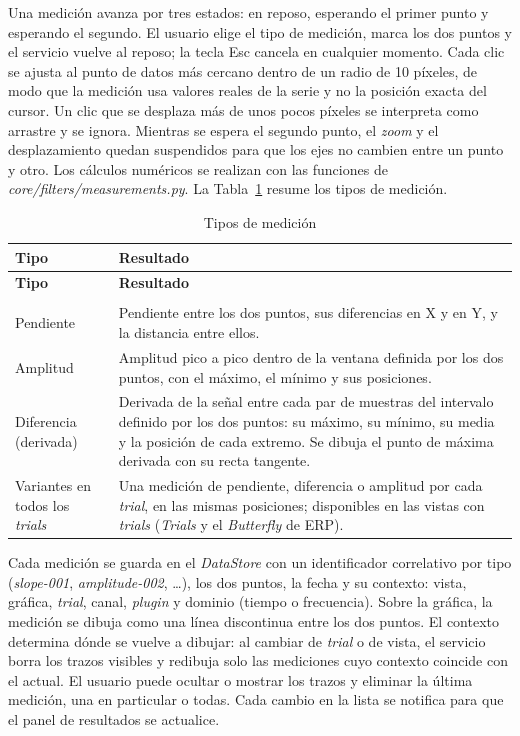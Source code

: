 \documentclass[12pt,letterpaper,oneside]{article}
\DeclareRobustCommand{\_}{\textunderscore\allowbreak}
\begin{document}
Una medición avanza por tres estados: en reposo, esperando el primer punto y esperando el segundo. El usuario elige el tipo de medición, marca los dos puntos y el servicio vuelve al reposo; la tecla Esc cancela en cualquier momento. Cada clic se ajusta al punto de datos más cercano dentro de un radio de 10 píxeles, de modo que la medición usa valores reales de la serie y no la posición exacta del cursor. Un clic que se desplaza más de unos pocos píxeles se interpreta como arrastre y se ignora. Mientras se espera el segundo punto, el \textit{zoom} y el desplazamiento quedan suspendidos para que los ejes no cambien entre un punto y otro. Los cálculos numéricos se realizan con las funciones de \textit{core/filters/measurements.py}. La Tabla~\ref{tab:sdd_mediciones} resume los tipos de medición.

\begin{center}
\small
\begin{longtable}{|p{}|p{}|}
\hline
\textbf{Tipo} & \textbf{Resultado} \\
\hline
\endfirsthead
\hline
\textbf{Tipo} & \textbf{Resultado} \\
\hline
\endhead
\hline
\endfoot
\hline
\caption{Tipos de medición} \label{tab:sdd_mediciones} \\
\endlastfoot
Pendiente & Pendiente entre los dos puntos, sus diferencias en X y en Y, y la distancia entre ellos. \\
\hline
Amplitud & Amplitud pico a pico dentro de la ventana definida por los dos puntos, con el máximo, el mínimo y sus posiciones. \\
\hline
Diferencia (derivada) & Derivada de la señal entre cada par de muestras del intervalo definido por los dos puntos: su máximo, su mínimo, su media y la posición de cada extremo. Se dibuja el punto de máxima derivada con su recta tangente. \\
\hline
Variantes en todos los \textit{trials} & Una medición de pendiente, diferencia o amplitud por cada \textit{trial}, en las mismas posiciones; disponibles en las vistas con \textit{trials} (\textit{Trials} y el \textit{Butterfly} de ERP). \\
\hline
\end{longtable}
\end{center}

Cada medición se guarda en el \textit{DataStore} con un identificador correlativo por tipo (\textit{slope-001}, \textit{amplitude-002}, \ldots), los dos puntos, la fecha y su contexto: vista, gráfica, \textit{trial}, canal, \textit{plugin} y dominio (tiempo o frecuencia). Sobre la gráfica, la medición se dibuja como una línea discontinua entre los dos puntos. El contexto determina dónde se vuelve a dibujar: al cambiar de \textit{trial} o de vista, el servicio borra los trazos visibles y redibuja solo las mediciones cuyo contexto coincide con el actual. El usuario puede ocultar o mostrar los trazos y eliminar la última medición, una en particular o todas. Cada cambio en la lista se notifica para que el panel de resultados se actualice.
\end{document}
